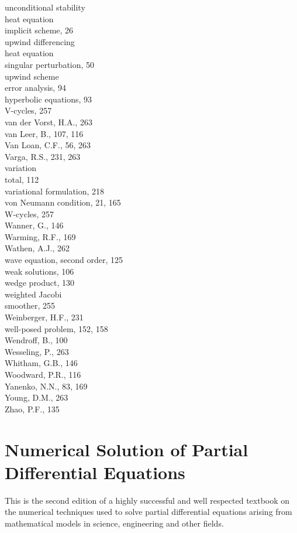 \documentclass[10pt]{article}
\begin{document}
unconditional stability\\
heat equation\\
implicit scheme, 26\\
upwind differencing\\
heat equation\\
singular perturbation, 50\\
upwind scheme\\
error analysis, 94\\
hyperbolic equations, 93\\
V-cycles, 257\\
van der Vorst, H.A., 263\\
van Leer, B., 107, 116\\
Van Loan, C.F., 56, 263\\
Varga, R.S., 231, 263\\
variation\\
total, 112\\
variational formulation, 218\\
von Neumann condition, 21, 165\\
W-cycles, 257\\
Wanner, G., 146\\
Warming, R.F., 169\\
Wathen, A.J., 262\\
wave equation, second order, 125\\
weak solutions, 106\\
wedge product, 130\\
weighted Jacobi\\
smoother, 255\\
Weinberger, H.F., 231\\
well-posed problem, 152, 158\\
Wendroff, B., 100\\
Wesseling, P., 263\\
Whitham, G.B., 146\\
Woodward, P.R., 116\\
Yanenko, N.N., 83, 169\\
Young, D.M., 263\\
Zhao, P.F., 135

\section*{Numerical Solution of Partial Differential Equations}
This is the second edition of a highly successful and well respected textbook on the numerical techniques used to solve partial differential equations arising from mathematical models in science, engineering and other fields.
\end{document}
